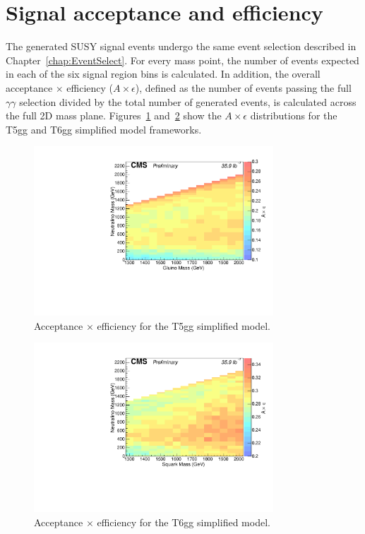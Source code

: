\section{Signal acceptance and efficiency}
The generated SUSY signal events undergo the same event selection described in Chapter~\ref{chap:EventSelect}. 
For every mass point, the number of events expected in each of the six signal region bins is calculated. 
In addition, the overall acceptance $\times$ efficiency ($A \times \epsilon$), defined as the number of events
passing the full $\gamma\gamma$ selection divided by the total number of generated events, is calculated across the 
full 2D mass plane. Figures~\ref{fig:accXeff_T5gg} and~\ref{fig:accXeff_T6gg} show the $A \times \epsilon$ distributions for the T5gg and T6gg simplified model 
frameworks.

\begin{figure}[h]
\begin{center}
\includegraphics[width=0.8\textwidth]{Figures/Results/accXeff_T5gg.pdf}
\end{center}
    \caption{Acceptance $\times$ efficiency for the T5gg simplified model.}
    \label{fig:accXeff_T5gg}
\end{figure}

\begin{figure}[h]
\begin{center}
\includegraphics[width=0.8\textwidth]{Figures/Results/accXeff_T6gg.pdf}
\end{center}
    \caption{Acceptance $\times$ efficiency for the T6gg simplified model.}
    \label{fig:accXeff_T6gg}
\end{figure}


